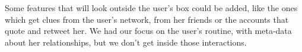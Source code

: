 Some features that will look outside the user's box could be added, like the ones which get clues from the user's network, from her friends or the accounts that quote and retweet her. We had our focus on the user's routine, with meta-data about her relationships, but we don't get inside those interactions.



